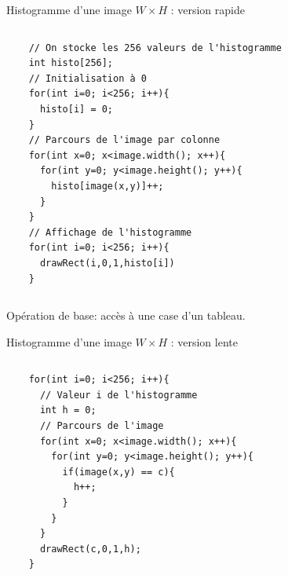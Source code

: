 \begin{frame}[fragile]{Histogramme d'une image $W\times{H}$ : version rapide}
\begin{columns}
    \begin{column}{0.65\textwidth}
    \begin{verbatim}
    // On stocke les 256 valeurs de l'histogramme 
    int histo[256];
    // Initialisation à 0
    for(int i=0; i<256; i++){
      histo[i] = 0;
    }
    // Parcours de l'image par colonne
    for(int x=0; x<image.width(); x++){
      for(int y=0; y<image.height(); y++){
        histo[image(x,y)]++;
      }
    }
    // Affichage de l'histogramme
    for(int i=0; i<256; i++){
      drawRect(i,0,1,histo[i])
    }
    \end{verbatim}
    \end{column}
    \begin{column}{0.4\textwidth}
    \end{column}

\end{columns}
Opération de base: accès à une case d'un tableau.
\end{frame}

\begin{frame}[fragile]{Histogramme d'une image $W\times{H}$ : version lente}
\begin{columns}
    \begin{column}{0.65\textwidth}
    \begin{verbatim}
    for(int i=0; i<256; i++){
      // Valeur i de l'histogramme
      int h = 0;
      // Parcours de l'image
      for(int x=0; x<image.width(); x++){
        for(int y=0; y<image.height(); y++){
          if(image(x,y) == c){
            h++;
          }
        }
      }
      drawRect(c,0,1,h);
    }
    \end{verbatim}
    \end{column}
    \begin{column}{0.35\textwidth}
    \end{column}
\end{columns}
\end{frame}

